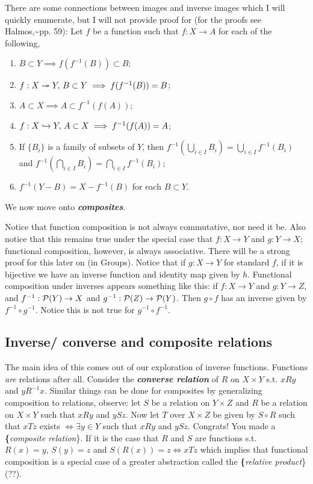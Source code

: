 \documentclass{report}
\begin{document}
There are some connections between images and inverse images which I will quickly enumerate, but I will not provide proof for (for the proofs see Halmos,\textasciitilde{}pp. 59):
Let \(f\) be a function such that \(f : X \to A\) for each of the following,
\begin{enumerate}
\item \(B \subset  Y \implies f(f^{-1}(B))\subset B\);
\item \(f : X \twoheadrightarrow   Y, \, B \subset Y \implies f(f^{-1}(B))=B\);
\item \(A \subset X \implies A \subset  f^{-1}(f(A))\);
\item \(f : X \hookrightarrow  Y , \, A \subset X  \implies f^{-1}(f(A))=A\);
\item If \(\{B_i\}\) is a family of subsets of \(Y\), then \(f^{-1}(\bigcup_{i \in  I} B_i ) =\bigcup_{i \in  I} f^{-1}(B_i)\) and \(f^{-1}(\bigcap_{i \in  I} B_i ) =\bigcap_{i \in  I} f^{-1}(B_i)\);
\item \(f^{-1}(Y-B)=X-f^{-1}(B)\) for each \(B \subset Y\).
\end{enumerate}

We now move onto \textbf{\emph{composites}}.

Notice that function composition is not always commutative, nor need it be. Also notice that this remains true under the special case that \(f :X \to Y\) and \(g : Y \to X\); functional composition, however, is always associative. There will be a strong proof for this later on (in Groups). Notice that if \(g : X\to Y\) for standard \(f\), if it is bijective we have an inverse function and identity map given by \(h\). Functional composition under inverses appears something like this: if \(f :X \to  Y\) and \(g: Y\to Z\), and \(f^{-1} : \mathcal{P}(Y) \to X\) and \(g^{-1} : \mathcal{P}(Z) \to \mathcal{P}(Y)\). Then \(g \circ f\) has an inverse given by \(f^{-1}\circ g^{-1}\). Notice this is not true for \(g^{-1}\circ f^{-1}\).
\subsection{Inverse/ converse and composite relations}
The main idea of this comes out of our exploration of inverse functions. Functions \emph{are} relations after all. Consider the \textbf{\emph{converse relation}} of \(R\) on \(X \times Y\) s.t. \(xRy\) and \(yR^{-1}x\). Similar things can be done for composites by generalizing composition to relations, observe: let \(S\) be a relation on \(Y \times Z\) and \(R\) be a relation on \(X \times Y\) such that \(xRy\) and \(ySz\). Now let \(T\) over \(X\times Z\) be given by \(S\circ R\) such that \(xTz\) exists \(\iff  \exists  y \in Y\) such that \(xRy\) and \(ySz\). Congrats! You made a \textbf\{\textit{composite relation}\}. If it is the case that \(R\) and \(S\) are functions s.t. \(R(x)=y, \, S(y)=z\) and \(S(R(x))=z \iff xTz\) which implies that functional composition is a special case of a greater abstraction called the \textbf\{\textit{relative product}\}(??).
\end{document}
